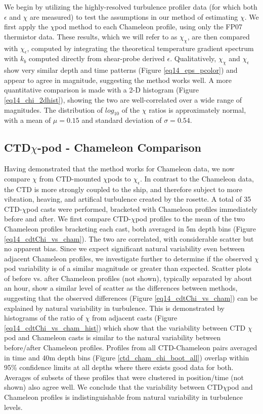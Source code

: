 \documentclass{ametsoc}
\begin{document}
We begin by utilizing the highly-resolved turbulence profiler data (for which both $\epsilon$ and $\chi$ are measured) to test the assumptions in our method of estimating $\chi$. We first apply the $\chi$pod method to each Chameleon profile, using only the FP07 thermistor data. These results, which we will refer to as $\chi_{\chi}$, are then compared with $\chi_{\epsilon}$, computed by integrating the theoretical temperature gradient spectrum with $k_b$ computed directly from shear-probe derived $\epsilon$. Qualitatively, $\chi_{\chi}$ and $\chi_{\epsilon}$ show very similar depth and time patterns (Figure \ref{eq14_eps_pcolor}) and appear to agree in magnitude, suggesting the method works well. A more quantitative comparison is made with a 2-D histogram (Figure \ref{eq14_chi_2dhist}), showing the two are well-correlated over a wide range of magnitudes. The distribution of $log_{10}$ of the $\chi$ ratios is approximately normal, with a mean of $\mu=0.15$ and standard deviation of $\sigma=0.54$. 



\subsection{ CTD$\chi$-pod - Chameleon Comparison}

Having demonstrated that the method works for Chameleon data, we now compare $\chi$ from CTD-mounted $\chi$pods to $\chi_{\epsilon}$. In contrast to the Chameleon data, the CTD is more strongly coupled to the ship, and therefore subject to more vibration, heaving, and artifical turbulence created by the rosette. A total of 35 CTD-$\chi$pod casts were performed, bracketed with Chameleon profiles immediately before and after. We first compare CTD-$\chi$pod profiles to the mean of the two Chameleon profiles bracketing each cast, both averaged in 5m depth bins (Figure \ref{eq14_cdtChi_vs_cham}). The two are correlated, with considerable scatter but no apparent bias. Since we expect significant natural variability even between adjacent Chameleon profiles, we investigate further to determine if the observed $\chi$pod variability is of a similar magnitude or greater than expected. Scatter plots of before vs. after Chameleon profiles (not shown), typically separated by about an hour, show a similar level of scatter as the differences between methods, suggesting that the observed differences (Figure \ref{eq14_cdtChi_vs_cham}) can be explained by natural variability in turbulence. This is demonstrated by histograms of the ratio of $\chi$ from adjacent casts (Figure \ref{eq14_cdtChi_vs_cham_hist}) which show that the variability between CTD $\chi$pod and Chameleon casts is similar to the natural variability between before/after Chameleon profiles. Profiles from all CTD-Chameleon pairs averaged in time and 40m depth bins (Figure \ref{ctd_cham_chi_boot_all}) overlap within 95\% confidence limits at all depths where there exists good data for both. Averages of subsets of these profiles that were clustered in position/time (not shown) also agree well. We conclude that the variability between CTD$\chi$pod and Chameleon profiles is indistinguishable from natural variability in turbulence levels.
\end{document}
